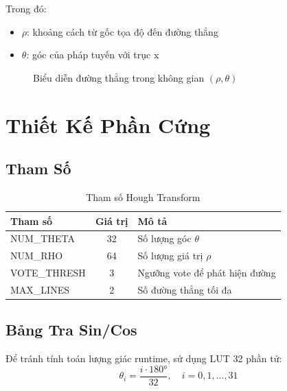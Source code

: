 \documentclass[12pt,a4paper]{report}
\begin{document}
Trong đó:
\begin{itemize}
    \item $\rho$: khoảng cách từ gốc tọa độ đến đường thẳng
    \item $\theta$: góc của pháp tuyến với trục x
\end{itemize}

\begin{figure}[h]
\centering
{}
\caption{Biểu diễn đường thẳng trong không gian $(\rho, \theta)$}
\end{figure}

\section{Thiết Kế Phần Cứng}

\subsection{Tham Số}
\begin{table}[h]
\centering
\begin{tabular}{|l|c|l|}
\hline
\textbf{Tham số} & \textbf{Giá trị} & \textbf{Mô tả} \\
\hline
NUM\_THETA & 32 & Số lượng góc $\theta$ \\
NUM\_RHO & 64 & Số lượng giá trị $\rho$ \\
VOTE\_THRESH & 3 & Ngưỡng vote để phát hiện đường \\
MAX\_LINES & 2 & Số đường thẳng tối đa \\
\hline
\end{tabular}
\caption{Tham số Hough Transform}
\end{table}

\subsection{Bảng Tra Sin/Cos}
Để tránh tính toán lượng giác runtime, sử dụng LUT 32 phần tử:
\begin{equation}
    \theta_i = \frac{i \cdot 180°}{32}, \quad i = 0, 1, ..., 31
\end{equation}
\end{document}

